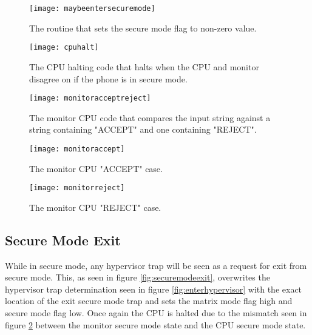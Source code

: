 \begin{figure}
  \centering
  \texttt{[image: maybeentersecuremode]}
  \caption{The routine that sets the secure mode flag to non-zero value.}
  \label{fig:maybeentersecuremode}
\end{figure}

\begin{figure}
  \centering
  \texttt{[image: cpuhalt]}
  \caption{The CPU halting code that halts when the CPU and monitor disagree on if the phone is in secure mode.}
  \label{fig:cpuhalt}
\end{figure}

\begin{figure}
  \centering
  \texttt{[image: monitoracceptreject]}
  \caption{The monitor CPU code that compares the input string against a string containing "ACCEPT" and one containing "REJECT".}
  \label{fig:monitoracceptreject}
\end{figure}

\begin{figure}
  \centering
  \texttt{[image: monitoraccept]}
  \caption{The monitor CPU "ACCEPT" case.}
  \label{fig:monitoraccept}
\end{figure}

\begin{figure}
  \centering
  \texttt{[image: monitorreject]}
  \caption{The monitor CPU "REJECT" case.}
  \label{fig:monitorreject}
\end{figure}


\subsection{Secure Mode Exit}

\label{Ch6 Sec3 Sub4}

While in secure mode, any hypervisor trap will be seen as a request for exit from secure mode. This, as seen in figure \ref{fig:securemodeexit}, overwrites the hypervisor trap determination seen in figure \ref{fig:enterhypervisor} with the exact location of the exit secure mode trap and sets the matrix mode flag high and secure mode flag low. Once again the CPU is halted due to the mismatch seen in figure \ref{fig:cpuhalt} between the monitor secure mode state and the CPU secure mode state.\\

